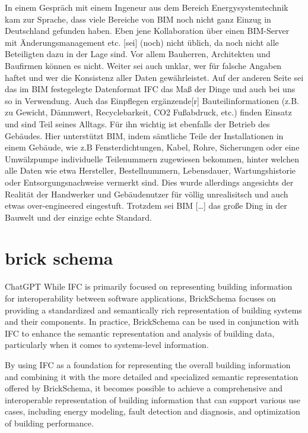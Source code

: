 In einem Gespräch mit einem Ingeneur aus dem Bereich \glqq{}Energysystemtechnik\grqq{} kam zur Sprache, dass viele Bereiche von BIM noch nicht ganz Einzug in Deutschland gefunden haben.
Eben jene \glqq{}Kollaboration über einen BIM-Server mit Änderungsmanagement etc. [sei] (noch) nicht üblich, da noch nicht alle Beteiligten dazu in der Lage sind. Vor allem Bauherren, Architekten und Baufirmen können es nicht\grqq{}.
Weiter sei \glqq{}auch unklar, wer für falsche Angaben haftet und wer die Konsistenz aller Daten gewährleistet\grqq{}.
Auf der anderen Seite sei \glqq{}das im BIM festegelegte Datenformat IFC das Maß der Dinge und auch bei uns so in Verwendung\grqq{}.
Auch das Einpflegen \glqq{}ergänzende[r] Bauteilinformationen (z.B. zu Gewicht, Dämmwert, Recyclebarkeit, CO2 Fußabdruck, etc.)\grqq{} finden Einsatz und sind Teil seines Alltags.
Für ihn wichtig ist ebenfalls der Betrieb des Gebäudes.
Hier unterstützt BIM, indem sämtliche Teile der Installationen in einem Gebäude, wie z.B Fensterdichtungen, Kabel, Rohre, Sicherungen oder eine Umwälzpumpe individuelle Teilenummern zugewiesen bekommen, hinter welchen alle Daten wie etwa Hersteller, Bestellnummern, Lebensdauer, Wartungshistorie oder Entsorgungsnachweise vermerkt sind.
Dies wurde allerdings \glqq{}angesichts der Realität der Handwerker und Gebäudenutzer für völlig unrealisitsch und auch etwas over-engineered\grqq{} eingestuft.
Trotzdem sei \glqq{}BIM [\ldots] das große Ding in der Bauwelt und der einzige echte Standard\grqq{}.

\section{brick schema}
ChatGPT \glqq{}While IFC is primarily focused on representing building information for interoperability between software applications, BrickSchema focuses on providing a standardized and semantically rich representation of building systems and their components. In practice, BrickSchema can be used in conjunction with IFC to enhance the semantic representation and analysis of building data, particularly when it comes to systems-level information.

By using IFC as a foundation for representing the overall building information and combining it with the more detailed and specialized semantic representation offered by BrickSchema, it becomes possible to achieve a comprehensive and interoperable representation of building information that can support various use cases, including energy modeling, fault detection and diagnosis, and optimization of building performance.\grqq{}


